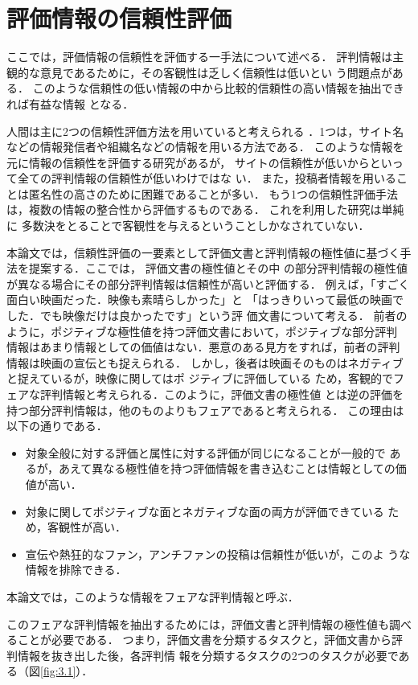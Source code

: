 \documentclass[japanese]{jnlp_1.3c}
\begin{document}
\section{評価情報の信頼性評価}

ここでは，評価情報の信頼性を評価する一手法について述べる．
評判情報は主観的な意見であるために，その客観性は乏しく信頼性は低いとい
う問題点がある．
このような信頼性の低い情報の中から比較的信頼性の高い情報を抽出できれば有益な情報
となる．

人間は主に2つの信頼性評価方法を用いていると考えられる
．1つは，サイト名などの情報発信者や組織名などの情報を用いる方法である．
このような情報を元に情報の信頼性を評価する研究\cite{mui,takehara}があるが，
サイトの信頼性が低いからといって全ての評判情報の信頼性が低いわけではな
い．
また，投稿者情報を用いることは匿名性の高さのために困難であることが多い．
もう1つの信頼性評価手法は，複数の情報の整合性から評価するものである．
これを利用した研究は単純に
多数決をとることで客観性を与えるということ\cite{tateishi}しかなされていない．

本論文では，信頼性評価の一要素として評価文書と評判情報の極性値に基づく手
法を提案する．ここでは，
評価文書の極性値とその中
の部分評判情報の極性値が異なる場合にその部分評判情報は信頼性が高いと評価する．
例えば，「すごく面白い映画だった．映像も素晴らしかった」と
「はっきりいって最低の映画でした．でも映像だけは良かったです」という評
価文書について考える．
前者のように，ポジティブな極性値を持つ評価文書において，ポジティブな部分評判
情報はあまり情報としての価値はない．悪意のある見方をすれば，前者の評判
情報は映画の宣伝とも捉えられる．
しかし，後者は映画そのものはネガティブと捉えているが，映像に関してはポ
ジティブに評価している
ため，客観的でフェアな評判情報と考えられる．このように，評価文書の極性値
とは逆の評価を持つ部分評判情報は，他のものよりもフェアであると考えられる．
この理由は以下の通りである．
\begin{itemize}
\item 対象全般に対する評価と属性に対する評価が同じになることが一般的で
あるが，あえて異なる極性値を持つ評価情報を書き込むことは情報としての価
値が高い．
\item 対象に関してポジティブな面とネガティブな面の両方が評価できている
ため，客観性が高い．
\item 宣伝や熱狂的なファン，アンチファンの投稿は信頼性が低いが，このよ
うな情報を排除できる．
\end{itemize}
本論文では，このような情報をフェアな評判情報と呼ぶ．

このフェアな評判情報を抽出するためには，評価文書と評判情報の極性値も調べ
ることが必要である．
つまり，評価文書を分類するタスクと，評価文書から評判情報を抜き出した後，各評判情
報を分類するタスクの2つのタスクが必要である（図\ref{fig:3.1}）．
\end{document}
